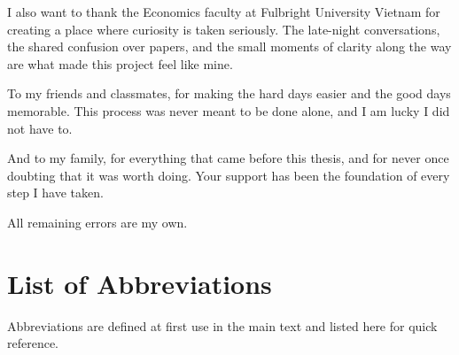 \documentclass{fulbrightthesis}
\begin{document}
\begin{romanpages}
I also want to thank the Economics faculty at Fulbright University Vietnam for creating a place where curiosity is taken seriously. The late-night conversations, the shared confusion over papers, and the small moments of clarity along the way are what made this project feel like mine.

To my friends and classmates, for making the hard days easier and the good days memorable. This process was never meant to be done alone, and I am lucky I did not have to.

And to my family, for everything that came before this thesis, and for never once doubting that it was worth doing. Your support has been the foundation of every step I have taken.

All remaining errors are my own.

\clearpage
{}
\listoftables

\clearpage
{}
\listoffigures

\newpage
\section*{List of Abbreviations}
\noindent Abbreviations are defined at first use in the main text and listed here for quick reference.


\end{romanpages}
\end{document}
